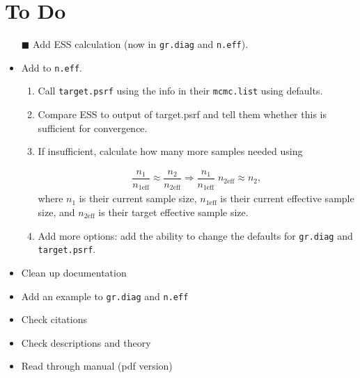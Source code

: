 \documentclass[12pt]{article}
\theoremstyle{remark}
\begin{document}
\section{To Do} %


\begin{itemize}
 \renewcommand{\labelitemi}{$\square$}
\item[$\blacksquare$]  Add ESS calculation (now in \texttt{gr.diag} and \texttt{n.eff}).
\item Add to \texttt{n.eff}. 
\begin{enumerate}
\item Call \texttt{target.psrf} using the info in their \texttt{mcmc.list} using  defaults.
\item Compare ESS to output of target.psrf and tell them whether this is sufficient for convergence.
\item If insufficient, calculate how many more samples needed using


\begin{align*}
\dfrac{n_1}{n_{1 \text{eff}}} \approx \dfrac{n_2}{n_{2 \text{eff}}} \Longrightarrow \dfrac{n_1}{n_{1 \text{eff}}} \; n_{2 \text{eff}} \approx n_2,
\end{align*}
where $n_1$ is their current sample size, ${n_{1 \text{eff}}}$ is their current effective sample size, and ${n_{2 \text{eff}}}$ is their target effective sample size. 
\item Add more options: add the ability to change the defaults for \texttt{gr.diag} and \texttt{target.psrf}. 
\end{enumerate}

 \renewcommand{\labelitemi}{$\square$}
\item Clean up documentation
\item Add an example to \texttt{gr.diag} and \texttt{n.eff}
\item Check citations
\item Check descriptions and theory
\item Read through manual (pdf version)
\end{itemize}








\end{document}
